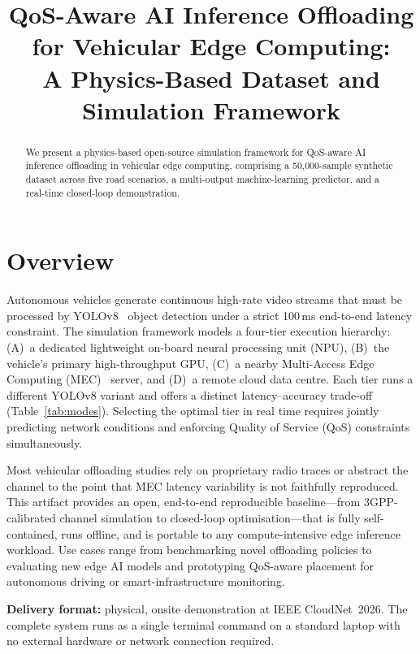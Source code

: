 \documentclass[10pt,conference]{IEEEtran}
\title{QoS-Aware AI Inference Offloading for Vehicular Edge Computing:\\
       A Physics-Based Dataset and Simulation Framework}
\author{%
  \IEEEauthorblockN{%
    Konstantinos Gyftodimos,\quad
    Eirini Liotou,\quad
    Kyriakos Chiotis,\quad
    George Dimitrakopoulos%
  }%
  \IEEEauthorblockA{%
    Dept.\ of Informatics and Telematics,
    Harokopio University of Athens (HUA), Athens, Greece\\
    \{kgyftodimos,\;eliotou,\;kchiotis,\;gdimitra\}@\textit{hua.gr}\quad
    \textit{Presenter: K.\,Gyftodimos\,---\,onsite}%
  }%
}
\begin{document}
\maketitle

\begin{abstract}
We present a physics-based open-source simulation framework for QoS-aware AI
inference offloading in vehicular edge computing, comprising a 50,000-sample
synthetic dataset across five road scenarios, a multi-output machine-learning
predictor, and a real-time closed-loop demonstration.
\end{abstract}

\section{Overview}

Autonomous vehicles generate continuous high-rate video streams that must be
processed by YOLOv8~\cite{yolov8} object detection under a strict 100\,ms
end-to-end latency constraint.  The simulation framework models a four-tier
execution hierarchy: (A)~a dedicated lightweight on-board neural processing
unit (NPU), (B)~the vehicle's primary high-throughput GPU, (C)~a nearby
Multi-Access Edge Computing (MEC)~\cite{etsi_mec} server, and (D)~a remote
cloud data centre.  Each tier runs a different YOLOv8 variant and offers a
distinct latency--accuracy trade-off (Table~\ref{tab:modes}).  Selecting the
optimal tier in real time requires jointly predicting network conditions and
enforcing Quality of Service (QoS) constraints simultaneously.

Most vehicular offloading studies rely on proprietary radio traces or abstract
the channel to the point that MEC latency variability is not faithfully
reproduced.  This artifact provides an open, end-to-end reproducible
baseline---from 3GPP-calibrated channel simulation to closed-loop
optimisation---that is fully self-contained, runs offline, and is portable to
any compute-intensive edge inference workload.  Use cases range from benchmarking novel offloading policies to evaluating
new edge AI models and prototyping QoS-aware placement for autonomous
driving or smart-infrastructure monitoring.

\textbf{Delivery format:} physical, onsite demonstration at IEEE
CloudNet~2026.  The complete system runs as a single terminal command on a
standard laptop with no external hardware or network connection required.
\end{document}
